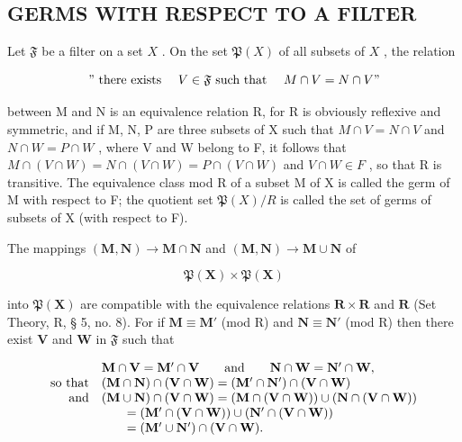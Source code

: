 \subsection{GERMS WITH RESPECT TO A FILTER}

Let \(\mathfrak{F}\) be a filter on a set \(X\) . On the set \(\mathfrak{P}(X)\) of all subsets of \(X\) , the relation

\[
" \text { there   exists } \quad V \in \mathfrak {F} \text { such   that } \quad M \cap V = N \cap V"
\]

between M and N is an equivalence relation R, for R is obviously reflexive and symmetric, and if M, N, P are three subsets of X such that \(M \cap V = N \cap V\) and \(N \cap W = P \cap W\) , where V and W belong to F, it follows that \(M \cap (V \cap W) = N \cap (V \cap W) = P \cap (V \cap W)\) and \(V \cap W \in F\) , so that R is transitive. The equivalence class mod R of a subset M of X is called the germ of M with respect to F; the quotient set \(\mathfrak{P}(X)/R\) is called the set of germs of subsets of X (with respect to F).

The mappings \((\mathbf{M},\mathbf{N})\to \mathbf{M}\cap \mathbf{N}\) and \((\mathbf{M},\mathbf{N})\rightarrow \mathbf{M}\cup \mathbf{N}\) of

\[
\mathfrak {P} (\mathbf {X}) \times \mathfrak {P} (\mathbf {X})
\]

into \(\mathfrak{P}(\mathbf{X})\) are compatible with the equivalence relations \(\mathbf{R} \times \mathbf{R}\) and \(\mathbf{R}\) (Set Theory, R, § 5, no. 8). For if \(\mathbf{M} \equiv \mathbf{M}'\) (mod R) and \(\mathbf{N} \equiv \mathbf{N}'\) (mod R) then there exist \(\mathbf{V}\) and \(\mathbf{W}\) in \(\mathfrak{F}\) such that

\[
\begin{array}{r l} & {\mathbf {M} \cap \mathbf {V} = \mathbf {M} ^ {\prime} \cap \mathbf {V} \qquad \mathrm{and} \qquad \mathbf {N} \cap \mathbf {W} = \mathbf {N} ^ {\prime} \cap \mathbf {W},} \\ {\mathrm{so\ that}} & {(\mathbf {M} \cap \mathbf {N}) \cap (\mathbf {V} \cap \mathbf {W}) = (\mathbf {M} ^ {\prime} \cap \mathbf {N} ^ {\prime}) \cap (\mathbf {V} \cap \mathbf {W})} \\ {\mathrm{and}} & {(\mathbf {M} \cup \mathbf {N}) \cap (\mathbf {V} \cap \mathbf {W}) = (\mathbf {M} \cap (\mathbf {V} \cap \mathbf {W})) \cup (\mathbf {N} \cap (\mathbf {V} \cap \mathbf {W}))} \\ & {\qquad = (\mathbf {M} ^ {\prime} \cap (\mathbf {V} \cap \mathbf {W})) \cup (\mathbf {N} ^ {\prime} \cap (\mathbf {V} \cap \mathbf {W}))} \\ & {\qquad = (\mathbf {M} ^ {\prime} \cup \mathbf {N} ^ {\prime}) \cap (\mathbf {V} \cap \mathbf {W}).} \end{array}
\]

